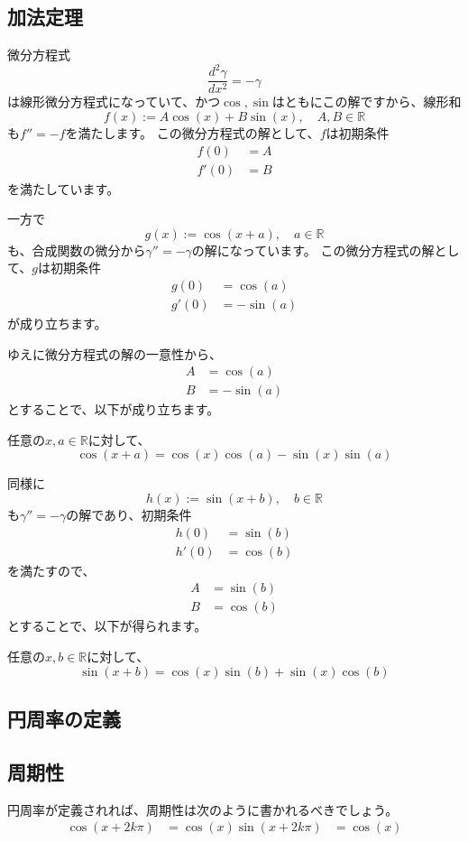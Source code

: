 \subsection{加法定理}

微分方程式
\[
  \frac{d^2\gamma}{dx^2}=-\gamma
\]
は線形微分方程式になっていて、かつ$\cos,\sin$はともにこの解ですから、線形和
\[
  f(x):=A\cos(x)+B\sin(x),\quad A,B\in\mathbb{R}
\]
も$f''=-f$を満たします。
この微分方程式の解として、$f$は初期条件
\begin{align*}
  f(0)&=A\\
  f'(0)&=B
\end{align*}
を満たしています。

一方で
\[
  g(x):=\cos(x+a),\quad a\in\mathbb{R}
\]
も、合成関数の微分から$\gamma''=-\gamma$の解になっています。
この微分方程式の解として、$g$は初期条件
\begin{align*}
  g(0)&=\cos(a)\\
  g'(0)&=-\sin(a)
\end{align*}
が成り立ちます。

ゆえに微分方程式の解の一意性から、
\begin{align*}
  A&=\cos(a)\\
  B&=-\sin(a)
\end{align*}
とすることで、以下が成り立ちます。
\begin{theorem}
  任意の$x,a\in\mathbb{R}$に対して、
  \[
    \cos(x+a)=\cos(x)\cos(a)-\sin(x)\sin(a)
  \]
\end{theorem}

同様に
\[
  h(x):=\sin(x+b),\quad b\in\mathbb{R}
\]
も$\gamma''=-\gamma$の解であり、初期条件
\begin{align*}
  h(0)&=\sin(b)\\
  h'(0)&=\cos(b)
\end{align*}
を満たすので、
\begin{align*}
  A&=\sin(b)\\
  B&=\cos(b)
\end{align*}
とすることで、以下が得られます。
\begin{theorem}
  任意の$x,b\in\mathbb{R}$に対して、
  \[
    \sin(x+b)=\cos(x)\sin(b)+\sin(x)\cos(b)
  \]
\end{theorem}

\subsection{円周率の定義}


\subsection{周期性}

円周率が定義されれば、周期性は次のように書かれるべきでしょう。
\begin{align*}
  \cos(x+2k\pi)&=\cos(x)
  \sin(x+2k\pi)&=\cos(x)
\end{align*}

